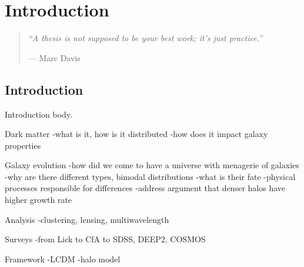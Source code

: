 \chapter{Introduction}
\label{chap:intro}

\begin{quote}{\textit{``A thesis is not supposed to be your best work; it's just
  practice.''}

--- Marc Davis}
\end{quote}


\section{Introduction}

Introduction body.


Dark matter
-what is it, how is it distributed
-how does it impact galaxy properties

Galaxy evolution
-how did we come to have a universe with menagerie of galaxies
-why are there different types, bimodal distributions
-what is their fate
-physical processes responsible for differences
-address argument that denser halos have higher growth rate

Analysis
-clustering, lensing, multiwavelength

Surveys
-from Lick to CfA to SDSS, DEEP2, COSMOS

Framework
-LCDM
-halo model
